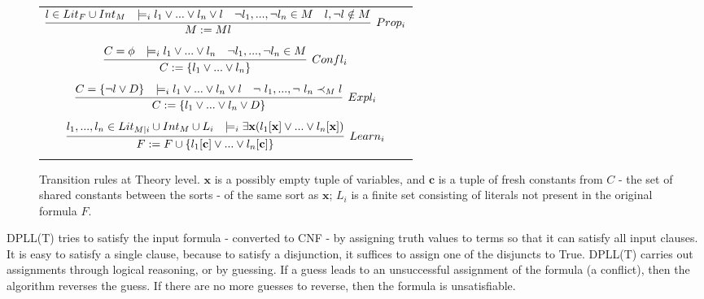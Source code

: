 \documentclass{article}
\begin{document}
\begin{figure}[t]
	\centering
	\begin{framed}
		\begin{tabular}{c}
			
			$\infer[Prop_i]{M := Ml}	{l \in Lit_F \cup Int_M & 
				\models_i l_1 \lor ... \lor 
				l_n \lor l & \neg l_1, ..., \neg l_n \in M & l,\neg l \notin M}$ \\ \\
			$\infer[Confl_i]{C := \{l_1 \lor ... \lor l_n \}}
			{C = \phi & \models_i l_1 \lor ... \lor l_n & 
				\neg l_1, ..., \neg l_n \in M}$ \\ \\
			$\infer[Expl_i]{C := \{l_1 \lor ... \lor l_n \lor D\}}
			{C = \{\neg l \lor D\} & \models_i l_1 \lor ... \lor l_n \lor l & 
				\neg\ l_1, ..., \neg\ l_n \prec_M l}$ \\ \\
			$\infer[Learn_i]{F := F \cup \{l_1[\textbf{c}] 
				\lor ... \lor l_n[\textbf{c}]\}}
			{l_1,...,l_n \in Lit_{M|i} \cup Int_M \cup L_i & 
				\models_i \exists \textbf{x}(l_1[\textbf{x}] \lor ... 
				\lor l_n[\textbf{x}])}$ \\ \\
		\end{tabular}
	\end{framed}
	\caption{Transition rules at Theory level. $\textbf{x}$ is a possibly empty 
		tuple of variables, and $\textbf{c}$ is a tuple of fresh constants 
		from $C$ - the set of shared constants between the sorts - of the
		same sort as $\textbf{x}$; $L_i$ is a finite set consisting of literals
		not present in the original formula $F$.}
	\label{fig:theoryrules}
\end{figure}

DPLL(T) tries to satisfy the input formula - converted to 
CNF - by assigning truth values to terms so that it can
satisfy all input clauses. It is easy to satisfy a single
clause, because to satisfy a disjunction, it suffices to
assign one of the disjuncts to True. DPLL(T) carries out
assignments through logical reasoning, or by guessing. If a
guess leads to an unsuccessful assignment of the formula 
(a conflict), then the algorithm reverses the guess. 
If there are no more guesses to reverse, then the formula is
unsatisfiable.
\end{document}
